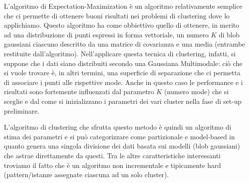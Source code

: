 \documentclass[]{report}
\begin{document}
	L'algoritmo di Expectation-Maximization è un algoritmo relativamente semplice che ci permette di ottenere buoni risultati nei problemi di clustering dove lo applichiamo. Questo algoritmo ha come obbiettivo quello di ottenere, in merito ad una distribuzione di punti espressi in forma vettoriale, un numero $K$ di blob gaussiani ciascuno descritto da una matrice di covarianza e una media (entrambe restituite dall'algoritmo). 
	Nell'applicare questa tecnica di clustering, infatti, si suppone che i dati siano distribuiti secondo una Gaussiana Multimodale: ciò che si vuole trovare è, in altri termini, una superficie di separazione che ci permetta di associare i punti alle rispettive mode. 
	Anche in questo caso le performance e i risultati sono fortemente influenzati dal parametro $K$ (numero mode) che si sceglie e dal come si inizializzano i parametri dei vari cluster nella fase di set-up preliminare. 
	
	L'algoritmo di clustering che sfrutta questo metodo è quindi un algoritmo di stima dei parametri e si può categorizzare come partizionale e model-based in quanto genera una singola divisione dei dati basata sui modelli (blob gaussiani) che astrae direttamente da questi. Tra le altre caratteristiche interessanti troviamo il fatto che è un algoritmo non incrementale e tipicamente hard (pattern/istanze assegnate ciascuna ad un solo cluster).   
	
\end{document}
